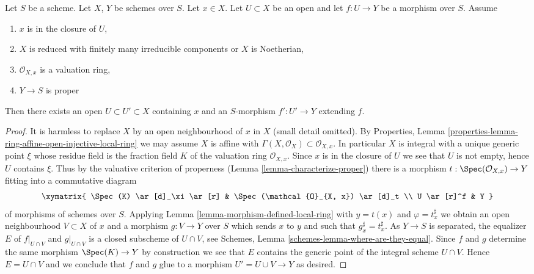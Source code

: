 \begin{lemma}
\label{lemma-extend-across}
Let $S$ be a scheme. Let $X$, $Y$ be schemes over $S$. Let $x \in X$.
Let $U \subset X$ be an open and let $f : U \to Y$ be a morphism over $S$.
Assume
\begin{enumerate}
\item $x$ is in the closure of $U$,
\item $X$ is reduced with finitely many irreducible components or
$X$ is Noetherian,
\item $\mathcal{O}_{X, x}$ is a valuation ring,
\item $Y \to S$ is proper
\end{enumerate}
Then there exists an open $U \subset U' \subset X$ containing
$x$ and an $S$-morphism $f' : U' \to Y$ extending $f$.
\end{lemma}

\begin{proof}
It is harmless to replace $X$ by an open neighbourhood of $x$ in $X$
(small detail omitted). By Properties, Lemma
\ref{properties-lemma-ring-affine-open-injective-local-ring}
we may assume $X$ is affine with
$\Gamma(X, \mathcal{O}_X) \subset \mathcal{O}_{X, x}$.
In particular $X$ is integral with a unique generic point $\xi$
whose residue field is the fraction field $K$ of the
valuation ring $\mathcal{O}_{X, x}$.
Since $x$ is in the closure of $U$ we see that $U$ is not
empty, hence $U$ contains $\xi$. Thus by the valuative criterion
of properness (Lemma \ref{lemma-characterize-proper})
there is a morphism $t : \Spec(\mathcal{O}_{X, x}) \to Y$
fitting into a commutative diagram
$$
\xymatrix{
\Spec(K) \ar[d]_\xi \ar[r] & \Spec(\mathcal{O}_{X, x}) \ar[d]_t \\
U \ar[r]^f & Y
}
$$
of morphisms of schemes over $S$. Applying
Lemma \ref{lemma-morphism-defined-local-ring}
with $y = t(x)$ and $\varphi = t^\sharp_x$ we obtain an open
neighbourhood $V \subset X$ of $x$ and a morphism $g : V \to Y$
over $S$ which sends $x$ to $y$ and such that $g^\sharp_x = t^\sharp_x$.
As $Y \to S$ is separated, the equalizer $E$ of $f|_{U \cap V}$
and $g|_{U \cap V}$ is a closed subscheme of $U \cap V$, see
Schemes, Lemma \ref{schemes-lemma-where-are-they-equal}.
Since $f$ and $g$ determine the same morphism $\Spec(K) \to Y$
by construction we see that $E$ contains the generic point
of the integral scheme $U \cap V$. Hence $E = U \cap V$ and
we conclude that $f$ and $g$ glue to a morphism $U' = U \cup V \to Y$
as desired.
\end{proof}





